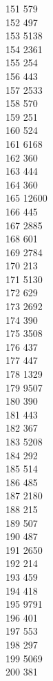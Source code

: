 { 151	579 \\
 152	497 \\
 153	5138 \\
 154	2361 \\
 155	254 \\
 156	443 \\
 157	2533 \\
 158	570 \\
 159	251 \\
 160	524 \\
 161	6168 \\
 162	360 \\
 163	444 \\
 164	360 \\
 165	12600 \\
 166	445 \\
 167	2885 \\
 168	601 \\
 169	2784 \\
 170	213 \\
 171	5130 \\
 172	629 \\
 173	2692 \\
 174	390 \\
 175	3508 \\
 176	437 \\
 177	447 \\
 178	1329 \\
 179	9507 \\
 180	390 \\
 181	443 \\
 182	367 \\
 183	5208 \\
 184	292 \\
 185	514 \\
 186	485 \\
 187	2180 \\
 188	215 \\
 189	507 \\
 190	487 \\
 191	2650 \\
 192	214 \\
 193	459 \\
 194	418 \\
 195	9791 \\
 196	401 \\
 197	553 \\
 198	297 \\
 199	5069 \\
 200	381 \\
}
